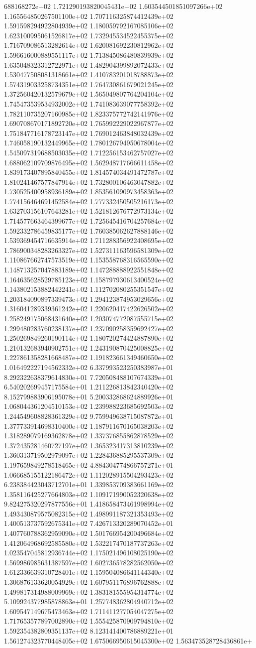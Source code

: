 688168272e+02	1.721290193820045431e+02	1.603544501851097266e+02	1.165564850267501100e+02	1.707116325874412439e+02	1.591598294922804939e+02	1.180059792167085106e+02	1.623100995061526817e+02	1.732945534522455375e+02	1.716709086513282614e+02	1.620081692230812962e+02	1.596616000889551117e+02	1.713845086480839939e+02	1.635048323312722971e+02	1.482904399892072433e+02	1.530477508081318661e+02	1.410783201018788873e+02	1.574319033258734351e+02	1.764730861679021245e+02	1.372560420132579679e+02	1.565049807764204104e+02	1.745473539534932002e+02	1.741083639077758392e+02	1.782110735207160985e+02	1.823375772742141976e+02	1.690708670171892720e+02	1.765992229022967877e+02	1.751847716178723147e+02	1.769012463848032439e+02	1.746058190132449965e+02	1.780126794950678004e+02	1.545097319688503035e+02	1.712256153462757027e+02	1.688062109709876495e+02	1.562948717666611458e+02	1.839173407895840455e+02	1.814574034491472787e+02	1.810241467577847914e+02	1.732800106463047882e+02	1.730525400958936189e+02	1.853561090973458363e+02	1.774156464691452584e+02	1.777332450505216173e+02	1.632703156107643281e+02	1.521812676772973134e+02	1.714577663464399677e+02	1.725645416704257684e+02	1.592332786459835177e+02	1.760385062627888146e+02	1.539369454716635914e+02	1.711288356922408695e+02	1.786900348283263327e+02	1.527311163596581309e+02	1.110867662747573519e+02	1.153558768316565590e+02	1.148713257047883189e+02	1.147288888922551848e+02	1.164635628529785123e+02	1.158797930613400524e+02	1.143802153882442241e+02	1.112702080255351547e+02	1.203184090897339473e+02	1.294123874953029656e+02	1.316041289339361242e+02	1.220620417422626502e+02	1.258249175068431640e+02	1.203074772087555715e+02	1.299480283760238137e+02	1.237090258359692427e+02	1.250269849260190114e+02	1.180720274424887890e+02	1.210132683940902751e+02	1.243190870425008825e+02	1.227861358281668487e+02	1.191823661349460650e+02	1.016492227194562332e+02	6.337993523250383987e+01	8.292322638379614830e+01	7.720508488107674339e+01	6.540202699457175584e+01	1.211226813842340420e+02	8.152799883906195078e+01	5.200332868624889926e+01	1.068044361204510153e+02	1.239988223685692503e+02	1.244549608828361329e+02	9.759949638715087872e+01	1.377733914698310400e+02	1.187911670165038203e+02	1.318289079169362878e+02	1.337376855862878529e+02	1.372435281460727197e+02	1.365323417313810239e+02	1.360313719502979097e+02	1.228436885295537309e+02	1.197659849278518465e+02	4.884304774866757271e+01	1.066685155122186472e+02	1.112028915504293423e+02	6.238384423043712701e+01	1.339853709383661169e+02	1.358116425277664803e+02	1.109171990052320638e+02	9.824275320297877556e+01	1.418658473461998994e+02	1.493430879575082315e+02	1.498991187321353493e+02	1.400513737592675341e+02	7.426713320289070452e+01	1.407760788362959090e+02	1.501766954200496684e+02	1.412064968692585580e+02	1.532217470187737263e+02	1.023547045812936744e+02	1.175021496108025190e+02	1.569986985631387597e+02	1.602736578282562050e+02	1.612336639310728401e+02	1.159504086641144340e+02	1.306876133620054929e+02	1.607951176896762888e+02	1.499817314988009969e+02	1.383181555954314774e+02	5.109924377985878863e+01	1.257748362804940712e+02	1.609547149675473463e+02	1.711411277054047275e+02	1.717653577897002890e+02	1.555425870909794810e+02	1.592354382809351137e+02	8.123141400786889221e+01	1.561274323770448405e+02	1.675066950615045300e+02	1.563473528728436861e+